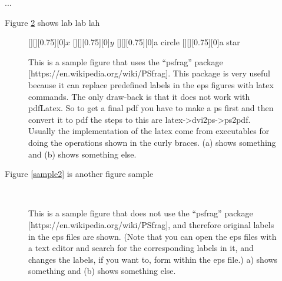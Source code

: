 ...

Figure \ref{sample1} shows lab lab lah
\begin{figure}[ph!]
[][][0.75][0]{$x$}
[][][0.75][0]{$y$}
[][][0.75][0]{a circle}
[][][0.75][0]{a star}
\centering
{}
 \\
\caption{\label{sample1} This is a sample figure that uses the ``psfrag'' package [https://en.wikipedia.org/wiki/PSfrag]. This package is very useful because it can replace predefined labels in the eps figures with latex commands. The only draw-back is that it does not work with pdfLatex. So to get a final pdf you have to make a ps first and then convert it to pdf {the steps to this are latex->dvi2ps->ps2pdf}. Usually the implementation of the latex come from executables for doing the operations shown in the curly braces. (a) shows something and (b) shows something else.} 
\end{figure}


Figure \ref{sample2} is another figure sample 
\begin{figure}[ph!]
\centering
{}
 \\
\caption{\label{sample1} This is a sample figure that does not use the ``psfrag'' package [https://en.wikipedia.org/wiki/PSfrag], and therefore original labels in the eps files are shown. (Note that you can open the eps files with a text editor and search for the corresponding labels in it, and changes the labels, if you want to, form within the eps file.)  a) shows something and (b) shows something else.} 
\end{figure}

